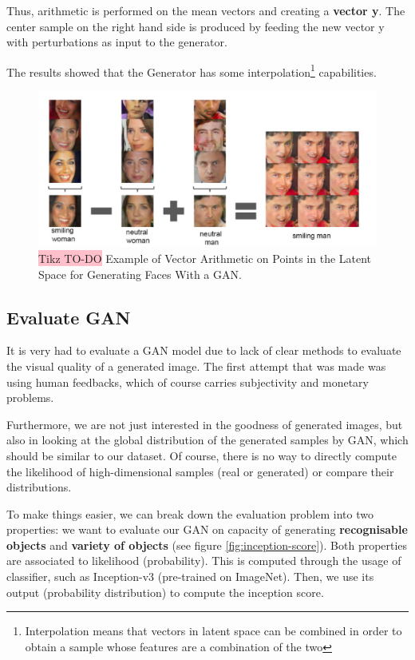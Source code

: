 Thus,  arithmetic is performed on the mean vectors and creating a
\textbf{vector y}. The center sample on the right hand side is produced by feeding the new vector y with perturbations as input to the generator. 

The results showed that the Generator has some interpolation\footnote{Interpolation means that vectors in latent space can be combined in order to obtain a sample  whose features are a combination of the two} capabilities.

\begin{figure}[!htbp]
    \centering
    \includegraphics[width=\linewidth]{tikz/Arithmetics of GAN.png}
    \caption{{\color{red}\colorbox{pink}{Tikz TO-DO}} Example of Vector Arithmetic on Points in the Latent Space for Generating Faces With a GAN.}
    \label{fig:GAN-faces}
\end{figure}

\subsection{Evaluate GAN}

It is very had to evaluate a GAN model due to lack of clear methods to evaluate the visual quality of a generated image. The first attempt that was made was using human feedbacks, which of course carries subjectivity and monetary problems.


Furthermore, we are not just interested in the goodness of generated images, but also in looking at the global distribution of the generated samples by GAN, which should be similar to our dataset. Of course, there is no way to directly compute the likelihood of high-dimensional samples (real or generated) or compare their distributions.

To make things easier, we can break down the evaluation problem into two properties: we want to evaluate our GAN on capacity of generating \textbf{recognisable objects} and \textbf{variety of objects} (see figure \ref{fig:inception-score}). Both properties are associated to likelihood (probability). This is computed through the usage of classifier, such as Inception-v3 (pre-trained on ImageNet).  Then, we use its output (probability distribution) to compute the inception score.


